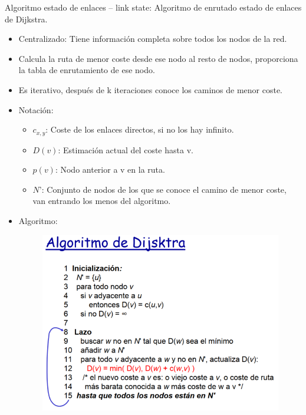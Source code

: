 \documentclass[12pt, twoside, openright]{report} %
\begin{document}
	Algoritmo estado de enlaces -- link state: Algoritmo de enrutado
    estado de enlaces de Dijkstra.

    \begin{itemize}
    \item
      Centralizado: Tiene información completa sobre todos los nodos de
      la red.
    \item
      Calcula la ruta de menor coste desde ese nodo al resto de nodos,
      proporciona la tabla de enrutamiento de ese nodo.
    \item
      Es iterativo, después de k iteraciones conoce los caminos de menor
      coste.
    \item
      Notación:

      \begin{itemize}
      \item
        \(c_{x,y}\): Coste de los enlaces directos, si no los hay
        infinito.
      \item
        \(D(v)\): Estimación actual del coste hasta v.
      \item
        \(p(v)\): Nodo anterior a v en la ruta.
      \item
        \(N’\): Conjunto de nodos de los que se conoce el camino de
        menor coste, van entrando los menos del algoritmo.
      \end{itemize}
	  \pagebreak
    \item
      Algoritmo:
	  \begin{figure}[H]
		{\includegraphics[scale=.4]{Untitled 39.png}}
	\end{figure}

\end{itemize}
\end{document}
